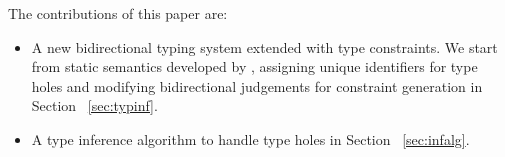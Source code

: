 

 The contributions of this paper are:
\begin{itemize}
  \item A new bidirectional typing system extended with type constraints. We start from static semantics developed by \citet{HazelnutPOPL}, assigning unique identifiers for type holes and modifying bidirectional judgements for constraint generation in Section ~\ref{sec:typinf}.
  \item A type inference algorithm to handle type holes in Section ~\ref{sec:infalg}.
\end{itemize}

